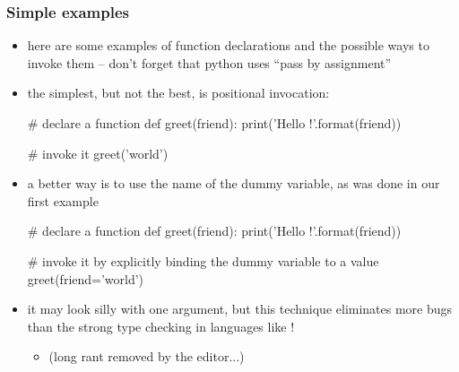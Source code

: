 \begin{frame}[fragile]
%
  \frametitle{Simple examples}
%
  \begin{itemize}
%
  \item here are some examples of function declarations and the possible ways to invoke them --
    don't forget that python uses ``pass by assignment''
%
  \item the simplest, but not the best, is positional invocation:
    \begin{ipython}{}
      # declare a function
      def greet(friend): print('Hello {}!'.format(friend))

      # invoke it
      greet('world')
    \end{ipython}
%
  \item a better way is to use the name of the dummy variable, as was done in our first example
    \begin{ipython}{}
      # declare a function
      def greet(friend): print('Hello {}!'.format(friend))

      # invoke it by explicitly binding the dummy variable to a value
      greet(friend='world')
    \end{ipython}
%
  \item it may look silly with one argument, but this technique eliminates more bugs than
    the strong type checking in languages like \cpp!
    \begin{itemize}
    \item (long rant removed by the editor...)
    \end{itemize}
%
  \end{itemize}
%
\end{frame}

